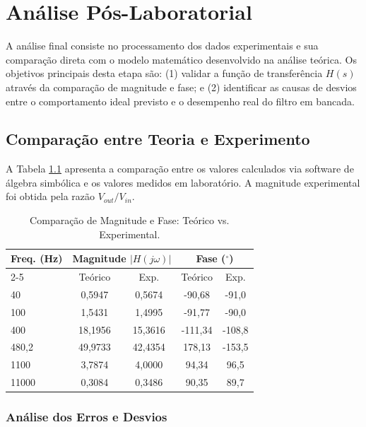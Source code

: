 \chapter{Análise Pós-Laboratorial}

A análise final consiste no processamento dos dados experimentais e sua comparação direta com o modelo matemático desenvolvido na análise teórica. Os objetivos principais desta etapa são: (1) validar a função de transferência $H(s)$ através da comparação de magnitude e fase; e (2) identificar as causas de desvios entre o comportamento ideal previsto e o desempenho real do filtro em bancada.

\section{Comparação entre Teoria e Experimento}

A Tabela \ref{tab:comparacao_resultados} apresenta a comparação entre os valores calculados via software de álgebra simbólica e os valores medidos em laboratório. A magnitude experimental foi obtida pela razão $V_{out}/V_{in}$.

\begin{table}[H]
	\centering
	\caption{Comparação de Magnitude e Fase: Teórico vs. Experimental.}
	\label{tab:comparacao_resultados}
	\begin{tabular}{l|c|c|c|c}
		\hline
		\multirow{2}{*}{\textbf{Freq. (Hz)}} & \multicolumn{2}{c|}{\textbf{Magnitude $|H(j\omega)|$}} & \multicolumn{2}{c}{\textbf{Fase ($^\circ$)}} \\ \cline{2-5}
		& Teórico & Exp. & Teórico & Exp. \\ \hline
		40      & 0,5947  & 0,5674  & -90,68  & -91,0  \\ [3pt]
		100     & 1,5431  & 1,4995  & -91,77  & -90,0  \\ [3pt]
		400     & 18,1956 & 15,3616 & -111,34 & -108,8 \\ [3pt]
		480,2   & 49,9733 & 42,4354 & 178,13  & -153,5 \\ [3pt]
		1100    & 3,7874  & 4,0000  & 94,34   & 96,5   \\ [3pt]
		11000   & 0,3084  & 0,3486  & 90,35   & 89,7   \\ [3pt]
		\hline
	\end{tabular}
\end{table}

\subsection{Análise dos Erros e Desvios}

